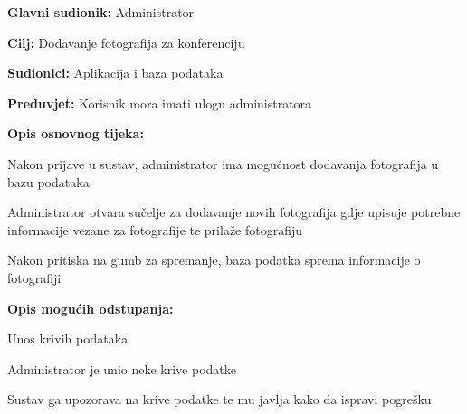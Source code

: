 				\noindent {}
				\begin{packed_item}
					
					\item \textbf{Glavni sudionik: } Administrator
					\item  \textbf{Cilj:} Dodavanje fotografija za konferenciju
					\item  \textbf{Sudionici:} Aplikacija i baza podataka
					\item  \textbf{Preduvjet:} Korisnik mora imati ulogu administratora
					\item  \textbf{Opis osnovnog tijeka:}
					
					\item[] \begin{packed_enum}
						
						\item Nakon prijave u sustav, administrator ima mogućnost dodavanja fotografija u bazu podataka
						\item Administrator otvara sučelje za dodavanje novih fotografija gdje upisuje potrebne informacije vezane za fotografije te prilaže fotografiju
						\item Nakon pritiska na gumb za spremanje, baza podatka sprema informacije o fotografiji
					\end{packed_enum}
					
					\item  \textbf{Opis mogućih odstupanja:}
					
					\item[] \begin{packed_item}
						
						\item[2.a] Unos krivih podataka
						\item[] \begin{packed_enum}
							
							\item Administrator je unio neke krive podatke
							\item Sustav ga upozorava na krive podatke te mu javlja kako da ispravi pogrešku
							
						\end{packed_enum}
						
						
					\end{packed_item}
				\end{packed_item}
				
